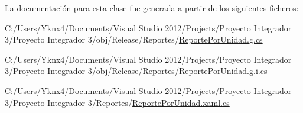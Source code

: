 La documentación para esta clase fue generada a partir de los siguientes ficheros\-:\begin{DoxyCompactItemize}
\item 
C\-:/\-Users/\-Yknx4/\-Documents/\-Visual Studio 2012/\-Projects/\-Proyecto Integrador 3/\-Proyecto Integrador 3/obj/\-Release/\-Reportes/\hyperlink{_reporte_por_unidad_8g_8cs}{Reporte\-Por\-Unidad.\-g.\-cs}\item 
C\-:/\-Users/\-Yknx4/\-Documents/\-Visual Studio 2012/\-Projects/\-Proyecto Integrador 3/\-Proyecto Integrador 3/obj/\-Release/\-Reportes/\hyperlink{_reporte_por_unidad_8g_8i_8cs}{Reporte\-Por\-Unidad.\-g.\-i.\-cs}\item 
C\-:/\-Users/\-Yknx4/\-Documents/\-Visual Studio 2012/\-Projects/\-Proyecto Integrador 3/\-Proyecto Integrador 3/\-Reportes/\hyperlink{_reporte_por_unidad_8xaml_8cs}{Reporte\-Por\-Unidad.\-xaml.\-cs}\end{DoxyCompactItemize}
